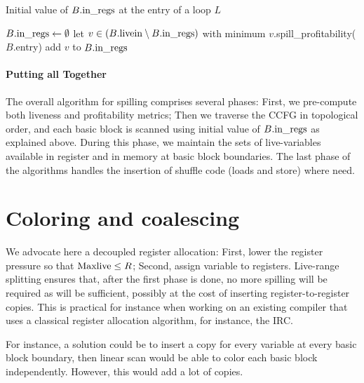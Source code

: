 {\begin{algorithm}[h]
\caption{\label{ra:code:initloop}Initial value of $B.\textrm{in\_regs}$ at the entry of a loop $L$}
  $B.\textrm{in\_regs} \gets \emptyset$\;
    {
    let $v \in (B.\textrm{livein} \setminus B.\textrm{in\_regs})$ with minimum $v$.spill\_profitability($B$.entry)\;
    add $v$ to $B.\textrm{in\_regs}$\;
  }
\end{algorithm}


\paragraph{Putting all Together}
The overall algorithm for spilling comprises several phases:
First, we pre-compute both liveness and profitability metrics;
Then we traverse the CCFG in topological order, and each basic block is scanned using initial value of $B.\textrm{in\_regs}$ as explained above.
During this phase, we maintain the sets of live-variables available in register and in memory at basic block boundaries.
The last phase of the algorithms handles the insertion of shuffle code (loads and store) where need.


\section{Coloring and coalescing}

We advocate here a decoupled register allocation: First, lower the register pressure so that $\mathrm{Maxlive} \leq R$; Second, assign variable to registers.
Live-range splitting ensures that, after the first phase is done, no more spilling will be required as \regs will be sufficient, possibly at the cost of inserting register-to-register copies.
This is practical for instance when working on an existing compiler that uses a classical register allocation algorithm, for instance, the IRC.


For instance, a solution could be to insert a copy for every variable at every basic block boundary, then linear scan would be able to color each basic block independently. However, this would add a lot of copies.

}
